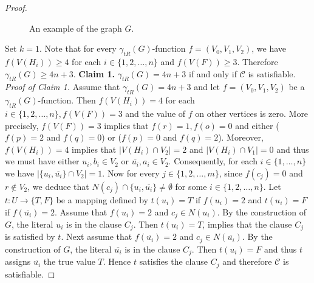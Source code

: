 \documentclass[10pt,a4paper]{amsart}
\begin{document}
\begin{proof}
\begin{figure}[ht]
\caption{An example of the graph $G$.}
\label{fig-2}
\end{figure}

Set $k=1$. Note that for every $\gamma _{tR}(G)$-function $f=(V_0, V_1, V_2)$, we
have $f(V(H_i))\geq 4$ for each $i\in \{1,2,\dots ,n\}$ and $f(V(F))\geq 3$. Therefore $\gamma _{tR}(G)\geq 4n+3$.\newline
\newline
\textbf{Claim 1.} $\gamma _{tR}(G)=4n+3$ if and only if $\mathcal{C}$ is satisfiable.\newline
\textit{Proof of Claim 1.} Assume that $\gamma _{tR}(G)=4n+3$ and let $f=(V_0, V_1, V_2)$ be a $\gamma _{tR}(G)$-function. Then $f(V(H_i))=4$ for each $i\in \{1,2,\dots ,n\}, f(V(F))=3$  and the value of $f$ on other vertices is zero. More precisely, $f(V(F))=3$ implies that $f(r)=1,f(o)=0$ and either ($f(p)=2$ and $f(q)=0$) or ($f(p)=0$ and $f(q)=2$). Moreover, $f(V(H_i))=4$ implies that $\left\vert V(H_i)\cap V_2\right\vert =2$ and $\left\vert V(H_i)\cap V_1\right\vert =0$ and thus we must have either $u_i,b_i\in V_2$ or
$\overline{u_i},a_i\in V_2$. Consequently, for each $i \in \{1, \dots , n\}$ we have $\left\vert \{u_i,\overline{u_i}\}\cap V_2\right\vert =1$. Now for every $j\in\{1, 2, \dots , m\}$, since $f(c_j)=0$ and $r\notin V_2$, we deduce that  $N(c_j)\cap \{u_i,\overline{u_i}\}\neq \emptyset $ for some $i\in \{1,2,\dots ,n\}$. Let $t:U\longrightarrow \{T,F\}$ be a mapping defined by $t(u_i)=T$ if $f(u_i)=2$ and $t(u_i)=F$ if $f(\overline{u_i})=2$.
Assume that $f(u_i)=2$ and $c_j\in N(u_i)$. By the construction of $G$, the literal $u_i$ is in the clause $C_j$. Then $t(u_i)=T$, implies that the clause $C_j$ is satisfied by $t$. Next assume that $f(\overline{u_i})=2$ and $c_j\in N(\overline{u_i})$. By the construction of $G$, the literal $\overline{u_i}$ is in the clause $C_j$. Then $t(u_i)=F$ and thus $t$ assigns $\overline{u_i}$ the true value $T$. Hence $t$ satisfies the clause $C_j$ and therefore $\mathcal{C}$ is satisfiable.


\end{proof}
\end{document}
